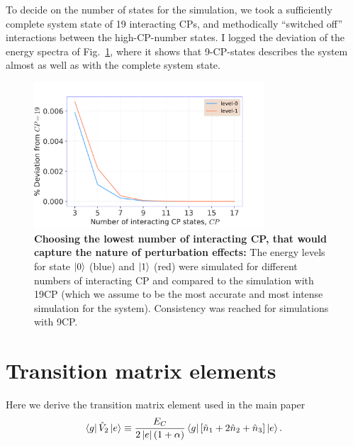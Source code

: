 \documentclass[%
superscriptaddress,
preprint,
preprintnumbers,
bibnotes,
amsmath,
amssymb,
aps,
showkeys,
prb,
]{revtex4-2}
\newcommand{\iket}[1]{\ensuremath{\Ket{#1}}}
\newcommand{\ibra}[1]{\ensuremath{\Bra{#1}}}
\newcommand{\iketbra}[2]{\ket{#1}\bra{#2}}
\newcommand{\iabs}[1]{\ensuremath{\left|#1\right|}}
\begin{document}
To decide on the number of states for the simulation, we took a sufficiently complete system state of 19 interacting CPs, and methodically ``switched off'' interactions between the high-CP-number states. I logged the deviation of the energy spectra of Fig.~\ref{fig:minimum_number}, where it shows that 9-CP-states describes the system almost as well as with the complete system state.

\begin{figure}[h]
  \includegraphics[width=86mm]{fig7}
  \caption{\small \textbf{Choosing the lowest number of interacting CP, that would  capture the nature of perturbation effects:} The energy levels for state \iket{0} (blue) and \iket{1} (red) were simulated for different numbers of interacting CP and compared to the simulation with 19CP (which we assume to be the most accurate and most intense simulation for the system). Consistency was reached for simulations with 9CP.
    \label{fig:minimum_number} }
\end{figure}


\section{Transition matrix elements}
\label{sec:trans-matr-elem}

\begin{framed}\noindent
  Here we derive the transition matrix element used in the main paper
      \begin{equation}
    \label{eq:dipole_voltage_6}
    \ibra{g}\hat{V}_2 \iket{e} \equiv \frac{E_{C}}{2 \iabs{e} (1+\alpha)}\ibra{g}\left[\hat{n}_1  +  2\hat{n}_{2}
        +\hat{n}_3 \right]\iket{e}.
  \end{equation}
\end{framed}
\end{document}

